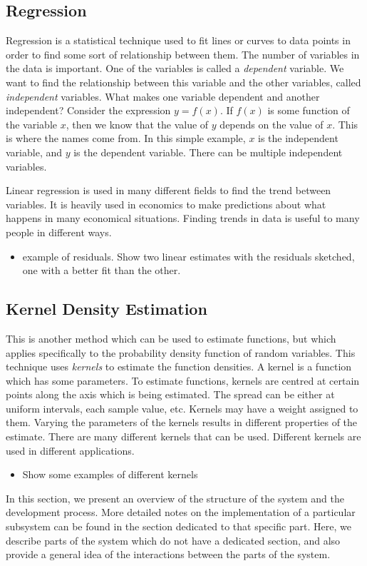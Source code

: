 \documentclass[a4paper,11pt]{article}
\begin{document}
\subsection{Regression}
\label{sec-2-3}

Regression is a statistical technique used to fit lines or curves to data
points in order to find some sort of relationship between them. The number of
variables in the data is important. One of the variables is called a \emph{dependent}
variable. We want to find the relationship between this variable and the other
variables, called \emph{independent} variables. What makes one variable
dependent and another independent? Consider the expression $y=f(x)$. If $f(x)$
is some function of the variable $x$, then we know that the value of $y$ depends
on the value of $x$. This is where the names come from. In this simple example,
$x$ is the independent variable, and $y$ is the dependent variable. There can be
multiple independent variables.

Linear regression is used in many different fields to find the trend between
variables. It is heavily used in economics to make predictions about what
happens in many economical situations. Finding trends in data is useful to many
people in different ways.

\begin{itemize}
\item example of residuals. Show two linear estimates with the residuals sketched,
  one with a better fit than the other.
\end{itemize}
\subsection{Kernel Density Estimation}
\label{sec-2-4}

   This is another method which can be used to estimate functions, but which
applies specifically to the probability density function of random
variables. This technique uses \emph{kernels} to estimate the function
densities. A kernel is a function which has some parameters. To estimate
functions, kernels are centred at certain points along the axis which is being
estimated. The spread can be either at uniform intervals, each sample value,
etc. Kernels may have a weight assigned to them. Varying the parameters of
the kernels results in different properties of the estimate. There are many
different kernels that can be used. Different kernels are used in different
applications.
\begin{itemize}
\item Show some examples of different kernels
\end{itemize}
In this section, we present an overview of the structure of the system and the
development process. More detailed notes on the implementation of a particular
subsystem can be found in the section dedicated to that specific part. Here, we
describe parts of the system which do not have a dedicated section, and also
provide a general idea of the interactions between the parts of the system.
\end{document}
